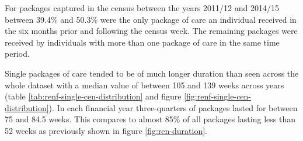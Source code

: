 \documentclass[]{article}
\begin{document}
For packages captured in the census between the years 2011/12 and
2014/15 between 39.4\% and 50.3\% were the only package of care an
individual received in the six months prior and following the census
week. The remaining packages were received by individuals with more than
one package of care in the same time period.

Single packages of care tended to be of much longer duration than seen
across the whole dataset with a median value of between 105 and 139
weeks across years (table \ref{tab:renf-single-cen-distribution} and
figure \ref{fig:renf-single-cen-distribution}). In each financial year
three-quarters of packages lasted for between 75 and 84.5 weeks. This
compares to almost 85\% of all packages lasting less than 52 weeks as
previously shown in figure \ref{fig:ren-duration}.

\begin{table}[h]
\centering
\caption{Summary statistics of package duration (weeks) for individuals receiving a single package of home care in 6 months surrounding the census}
\label{tab:renf-single-cen-distribution}
\end{table}
\end{document}
